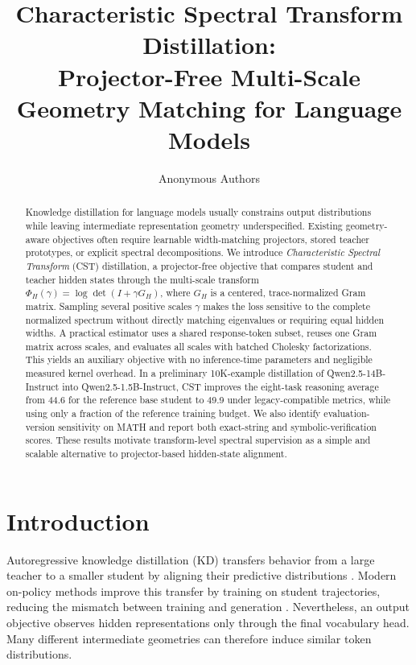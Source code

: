 \documentclass{article}
\title{Characteristic Spectral Transform Distillation:\\
Projector-Free Multi-Scale Geometry Matching for Language Models}
\author{Anonymous Authors}
\newcommand{\cst}{\textsc{CST}}
\begin{document}
\maketitle

\begin{abstract}
Knowledge distillation for language models usually constrains output
distributions while leaving intermediate representation geometry
underspecified.  Existing geometry-aware objectives often require learnable
width-matching projectors, stored teacher prototypes, or explicit spectral
decompositions.  We introduce \emph{Characteristic Spectral Transform}
(\cst) distillation, a projector-free objective that compares student and
teacher hidden states through the multi-scale transform
$\Phi_H(\gamma)=\log\det(I+\gamma G_H)$, where $G_H$ is a centered,
trace-normalized Gram matrix.  Sampling several positive scales $\gamma$
makes the loss sensitive to the complete normalized spectrum without directly
matching eigenvalues or requiring equal hidden widths.  A practical estimator
uses a shared response-token subset, reuses one Gram matrix across scales, and
evaluates all scales with batched Cholesky factorizations.  This yields an
auxiliary objective with no inference-time parameters and negligible measured
kernel overhead.  In a preliminary 10K-example distillation of
Qwen2.5-14B-Instruct into Qwen2.5-1.5B-Instruct, \cst{} improves the
eight-task reasoning average from 44.6 for the reference base student to 49.9
under legacy-compatible metrics, while using only a fraction of the reference
training budget.  We also identify evaluation-version sensitivity on MATH and
report both exact-string and symbolic-verification scores.  These results
motivate transform-level spectral supervision as a simple and scalable
alternative to projector-based hidden-state alignment.
\end{abstract}

\section{Introduction}

Autoregressive knowledge distillation (KD) transfers behavior from a large
teacher to a smaller student by aligning their predictive distributions
\citep{hinton2015distilling,kim2016sequence,gu2024minillm,agarwal2024gkd}.
Modern on-policy methods improve this transfer by training on student
trajectories, reducing the mismatch between training and generation
\citep{ko2024distillm}.  Nevertheless, an output objective observes hidden
representations only through the final vocabulary head.  Many different
intermediate geometries can therefore induce similar token distributions.
\end{document}
